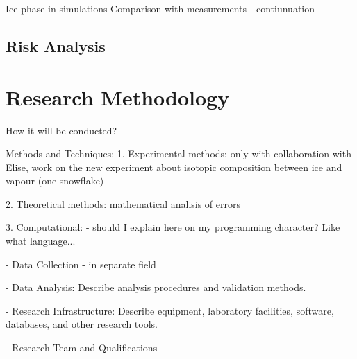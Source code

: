\documentclass[11pt,a4paper]{article}
\begin{document}
Ice phase in simulations
Comparison with measurements - contiunuation

\subsection{Risk Analysis}






\section{Research Methodology}
How it will be conducted?


Methods and Techniques: 
1. Experimental methods: 
  only with collaboration with Elise, work on the new experiment about isotopic composition between ice and vapour (one snowflake)

2. Theoretical methods:
  mathematical analisis of errors

3. Computational: 
 - should I explain here on my programming character? Like what language...

- Data Collection - in separate field

- Data Analysis: Describe analysis procedures and validation methods.

- Research Infrastructure: Describe equipment, laboratory facilities, software, databases,
and other research tools.

- Research Team and Qualifications


\appendix

\clearpage
\printbibliography
\end{document}
